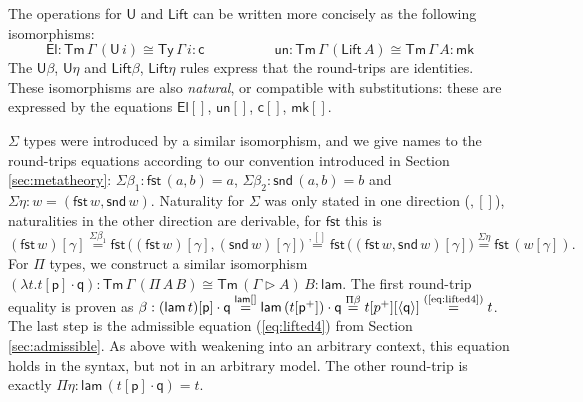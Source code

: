 \documentclass[a4paper,UKenglish]{article}
\newcommand{\Ty}{\mathsf{Ty}}
\newcommand{\Tm}{\mathsf{Tm}}
\newcommand{\p}{\mathsf{p}}
\newcommand{\q}{\mathsf{q}}
\newcommand{\ext}{\mathop{\triangleright}}
\newcommand{\lam}{\mathsf{lam}}
\newcommand{\U}{\mathsf{U}}
\newcommand{\El}{\mathsf{El}}
\newcommand{\cd}{\mathsf{c}}
\newcommand{\fst}{\mathsf{fst}}
\newcommand{\snd}{\mathsf{snd}}
\newcommand{\Lift}{\mathsf{Lift}}
\newcommand{\mk}{\mathsf{mk}}
\newcommand{\un}{\mathsf{un}}
\begin{document}
The operations for $\U$ and $\Lift$ can be written more concisely as
the following isomorphisms:
\[
\El:\Tm\,\Gamma\,(\U\,i) \cong \Ty\,\Gamma\,i:\cd \hspace{5em} \un:\Tm\,\Gamma\,(\Lift\,A)\cong\Tm\,\Gamma\,A:\mk
\]
The $\U\beta$, $\U\eta$ and $\Lift\beta$, $\Lift\eta$ rules express
that the round-trips are identities. These isomorphisms are also
\emph{natural}, or compatible with substitutions: these are expressed
by the equations $\El[]$, $\un[]$, $\cd[]$, $\mk[]$.

$\Sigma$ types were introduced by a similar isomorphism, and we give
names to the round-trips equations according to our convention introduced in
Section \ref{sec:metatheory}: $\Sigma\beta_1 : \fst\,(a,b) = a$,
$\Sigma\beta_2 : \snd\,(a,b) = b$ and $\Sigma\eta : w =
(\fst\,w,\snd\,w)$. Naturality for $\Sigma$ was only stated in one
direction (${,}[]$), naturalities in the other direction are
derivable, for $\fst$ this is
$
(\fst\,w)[\gamma]  \overset{\Sigma\beta_1}{=}                          
\fst\,\big((\fst\,w)[\gamma],(\snd\,w)[\gamma]\big) \overset{{,}[]}{=} 
\fst\,\big((\fst\,w,\snd\,w)[\gamma]\big)  \overset{\Sigma\eta}=        
\fst\,(w[\gamma]).
$
For $\Pi$ types, we construct a similar isomorphism
$
(\lambda t.t[\p]\cdot\q) : \Tm\,\Gamma\,(\Pi\,A\,B) \cong \Tm\,(\Gamma\ext A)\,B : \lam.
$
The first round-trip equality is proven as
$\beta : (\lam\,t)[\p]\cdot\q \overset{\lam[]}{=} \lam\,(t[\p^+])\cdot\q \overset{\Pi\beta}{=} t[p^+][\langle\q\rangle] \overset{\text{(\ref{eq:lifted4})}}{=} t$.
The last step is the admissible equation (\ref{eq:lifted4}) from
Section \ref{sec:admissible}. As above with weakening into an
arbitrary context, this equation holds in the syntax, but not in an
arbitrary model.
The other round-trip is exactly $\Pi\eta : \lam\,(t[\p]\cdot\q) = t$.
\end{document}
